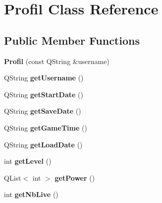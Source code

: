 \hypertarget{class_profil}{}\section{Profil Class Reference}
\label{class_profil}
\subsection*{Public Member Functions}
\begin{DoxyCompactItemize}
\item 
\hypertarget{class_profil_ad874b5e5885c947739f7dfa8a8932442}{}{\bfseries Profil} (const Q\+String \&username)\label{class_profil_ad874b5e5885c947739f7dfa8a8932442}

\item 
\hypertarget{class_profil_af0ab359fbf8feb7e703293c9025e8d36}{}Q\+String {\bfseries get\+Username} ()\label{class_profil_af0ab359fbf8feb7e703293c9025e8d36}

\item 
\hypertarget{class_profil_aa51ac79c413e575f32166eac7694c313}{}Q\+String {\bfseries get\+Start\+Date} ()\label{class_profil_aa51ac79c413e575f32166eac7694c313}

\item 
\hypertarget{class_profil_a9858f08dfaff3155450e2f2a66ae50cf}{}Q\+String {\bfseries get\+Save\+Date} ()\label{class_profil_a9858f08dfaff3155450e2f2a66ae50cf}

\item 
\hypertarget{class_profil_a8c75d1768cb705d48d8d1f0519512e55}{}Q\+String {\bfseries get\+Game\+Time} ()\label{class_profil_a8c75d1768cb705d48d8d1f0519512e55}

\item 
\hypertarget{class_profil_a9755d065b6f920862fdf642af15c7a7d}{}Q\+String {\bfseries get\+Load\+Date} ()\label{class_profil_a9755d065b6f920862fdf642af15c7a7d}

\item 
\hypertarget{class_profil_a5fd30de19283f6ae22a7232dd22e2afa}{}int {\bfseries get\+Level} ()\label{class_profil_a5fd30de19283f6ae22a7232dd22e2afa}

\item 
\hypertarget{class_profil_aea2c7ddbba5567c777b37293f5fa2aaa}{}Q\+List$<$ int $>$ {\bfseries get\+Power} ()\label{class_profil_aea2c7ddbba5567c777b37293f5fa2aaa}

\item 
\hypertarget{class_profil_a4747a4a9cf7d22203bc316f3a0753033}{}int {\bfseries get\+Nb\+Live} ()\label{class_profil_a4747a4a9cf7d22203bc316f3a0753033}


\end{DoxyCompactItemize}
